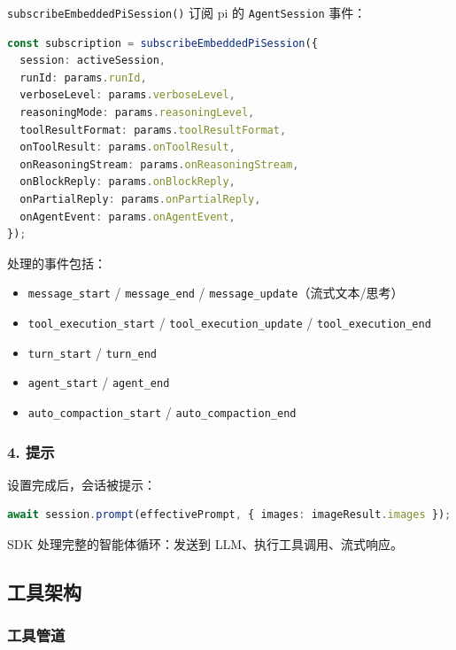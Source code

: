 \texttt{subscribeEmbeddedPiSession()} 订阅 pi 的 \texttt{AgentSession} 事件：

\begin{lstlisting}[language=typescript]
const subscription = subscribeEmbeddedPiSession({
  session: activeSession,
  runId: params.runId,
  verboseLevel: params.verboseLevel,
  reasoningMode: params.reasoningLevel,
  toolResultFormat: params.toolResultFormat,
  onToolResult: params.onToolResult,
  onReasoningStream: params.onReasoningStream,
  onBlockReply: params.onBlockReply,
  onPartialReply: params.onPartialReply,
  onAgentEvent: params.onAgentEvent,
});
\end{lstlisting}


处理的事件包括：

\begin{itemize}
  \item \texttt{message\_start} / \texttt{message\_end} / \texttt{message\_update}（流式文本/思考）
  \item \texttt{tool\_execution\_start} / \texttt{tool\_execution\_update} / \texttt{tool\_execution\_end}
  \item \texttt{turn\_start} / \texttt{turn\_end}
  \item \texttt{agent\_start} / \texttt{agent\_end}
  \item \texttt{auto\_compaction\_start} / \texttt{auto\_compaction\_end}
\end{itemize}


\subsubsection{4. 提示}


设置完成后，会话被提示：

\begin{lstlisting}[language=typescript]
await session.prompt(effectivePrompt, { images: imageResult.images });
\end{lstlisting}


SDK 处理完整的智能体循环：发送到 LLM、执行工具调用、流式响应。

\subsection{工具架构}


\subsubsection{工具管道}


